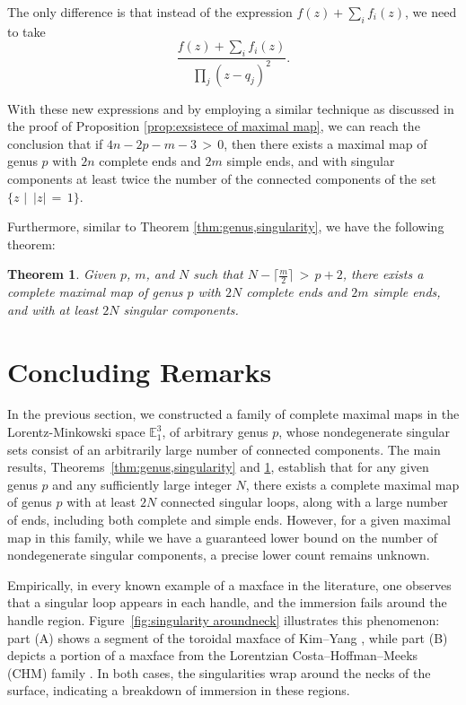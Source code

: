 \documentclass[12pt]{amsart}
\newtheorem{theorem}{Theorem}[section]
\numberwithin{equation}{section}
\begin{document}
The only difference is that instead of the expression \(f(z) + \sum_i f_i(z)\), we
need to take \[\frac{f(z) + \sum_i f_i(z)}{\prod_j (z - 
q_j)^2}.\]

With these new expressions and by employing a similar technique as discussed in the proof of Proposition 
\ref{prop:exsistece of maximal map}, we can reach the conclusion that if \(4n - 2p - m - 3 \,>\, 0\), then there exists a 
maximal map of genus \(p\) with \(2n\) complete ends and \(2m\) simple ends, and with singular components at 
least twice the number of the connected components of the set \(\{z\,\,\big\vert\,\,\, |z| \,=\, 1\}\).

Furthermore, similar to Theorem \ref{thm:genus,singularity}, we have the following theorem:

\begin{theorem}\label{thm:simple and Complete ends}
Given \(p\), \(m\), and \(N\) such that \(N - \lceil \frac{m}{2} \rceil \,>\, p + 2\), there exists a complete maximal map of
genus \(p\) with \(2N\) complete ends and \(2m\) simple ends, and with at least \(2N\) singular components.
\end{theorem}
\section{Concluding Remarks}\label{sec:conclusion}

In the previous section, we constructed a family of complete maximal maps in the Lorentz-Minkowski space $\mathbb{E}^3_1$, of arbitrary genus \(p\), whose nondegenerate singular sets consist of an arbitrarily large number of connected components. The main results, Theorems~\ref{thm:genus,singularity} and \ref{thm:simple and Complete ends}, establish that for any given genus \(p\) and any sufficiently large integer \(N\), there exists a complete maximal map of genus \(p\) with at least \(2N\) connected singular loops, along with a large number of ends, including both complete and simple ends. However, for a given maximal map in this family, while we have a guaranteed lower bound on the number of nondegenerate singular components, a precise lower count remains unknown.

Empirically, in every known example of a maxface in the literature, one observes that a singular loop appears in each handle, and the immersion fails around the handle region. Figure~\ref{fig:singularity aroundneck} illustrates this phenomenon: part (A) shows a segment of the toroidal maxface of Kim–Yang \cite{Kim2006}, while part (B) depicts a portion of a maxface from the Lorentzian Costa–Hoffman–Meeks (CHM) family \cite{chen2024singularitiesmaxfacesconstructednodeopening}. In both cases, the singularities wrap around the necks of the surface, indicating a breakdown of immersion in these regions.
\end{document}
